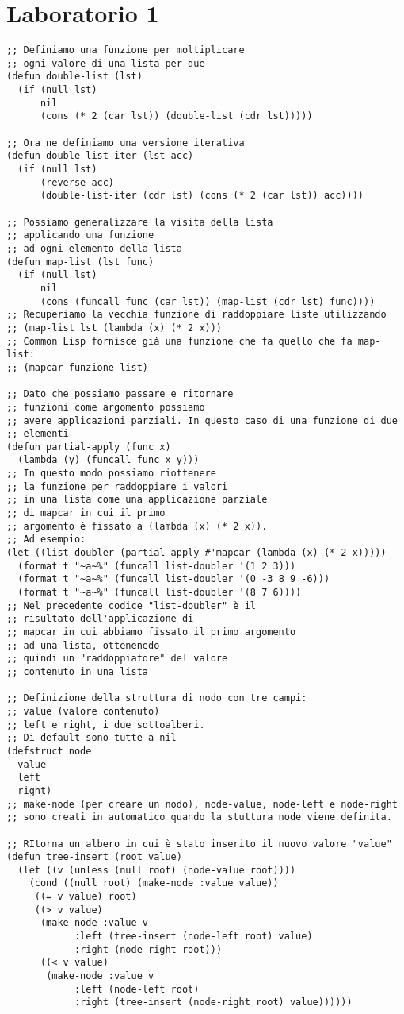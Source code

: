 \documentclass[a4paper,12pt, oneside]{book}
\begin{document}
\section{Laboratorio 1}
\begin{verbatim}
;; Definiamo una funzione per moltiplicare 
;; ogni valore di una lista per due
(defun double-list (lst)
  (if (null lst)
      nil
      (cons (* 2 (car lst)) (double-list (cdr lst)))))

;; Ora ne definiamo una versione iterativa
(defun double-list-iter (lst acc)
  (if (null lst)
      (reverse acc)
      (double-list-iter (cdr lst) (cons (* 2 (car lst)) acc))))

;; Possiamo generalizzare la visita della lista 
;; applicando una funzione
;; ad ogni elemento della lista
(defun map-list (lst func)
  (if (null lst)
      nil
      (cons (funcall func (car lst)) (map-list (cdr lst) func))))
;; Recuperiamo la vecchia funzione di raddoppiare liste utilizzando
;; (map-list lst (lambda (x) (* 2 x)))
;; Common Lisp fornisce già una funzione che fa quello che fa map-list:
;; (mapcar funzione list)

;; Dato che possiamo passare e ritornare  
;; funzioni come argomento possiamo
;; avere applicazioni parziali. In questo caso di una funzione di due
;; elementi
(defun partial-apply (func x)
  (lambda (y) (funcall func x y)))
;; In questo modo possiamo riottenere 
;; la funzione per raddoppiare i valori
;; in una lista come una applicazione parziale 
;; di mapcar in cui il primo
;; argomento è fissato a (lambda (x) (* 2 x)).
;; Ad esempio:
(let ((list-doubler (partial-apply #'mapcar (lambda (x) (* 2 x)))))
  (format t "~a~%" (funcall list-doubler '(1 2 3)))
  (format t "~a~%" (funcall list-doubler '(0 -3 8 9 -6)))
  (format t "~a~%" (funcall list-doubler '(8 7 6))))
;; Nel precedente codice "list-doubler" è il
;; risultato dell'applicazione di
;; mapcar in cui abbiamo fissato il primo argomento 
;; ad una lista, ottenenedo
;; quindi un "raddoppiatore" del valore 
;; contenuto in una lista

;; Definizione della struttura di nodo con tre campi:
;; value (valore contenuto)
;; left e right, i due sottoalberi.
;; Di default sono tutte a nil
(defstruct node
  value
  left
  right)
;; make-node (per creare un nodo), node-value, node-left e node-right
;; sono creati in automatico quando la stuttura node viene definita.

;; RItorna un albero in cui è stato inserito il nuovo valore "value"
(defun tree-insert (root value)
  (let ((v (unless (null root) (node-value root))))
    (cond ((null root) (make-node :value value))
     ((= v value) root)
     ((> v value)
      (make-node :value v
            :left (tree-insert (node-left root) value)
            :right (node-right root)))
      ((< v value)
       (make-node :value v
            :left (node-left root)
            :right (tree-insert (node-right root) value))))))


\end{verbatim}
\end{document}
